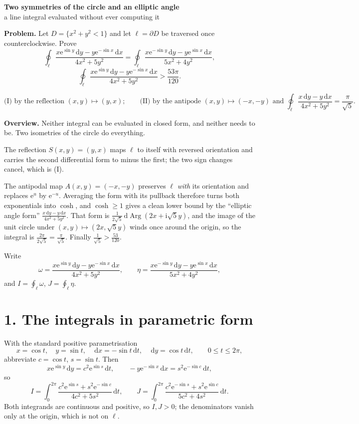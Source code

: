 \documentclass[12pt]{article}
\newcommand{\dd}{\,\mathrm{d}}
\newcommand{\ii}{\mathrm{i}}
\newcommand{\e}{\mathrm{e}}
\newcommand{\Arg}{\operatorname{Arg}}
\newcommand{\lc}{\ell}
\begin{document}
\begin{center}
{\Large\bfseries Two symmetries of the circle and an elliptic angle}\\[0.35em]
{\large a line integral evaluated without ever computing it}
\end{center}

\textbf{Problem.} Let \(D=\{x^2+y^2<1\}\) and let \(\lc=\partial D\) be
traversed once counterclockwise. Prove
\[
\oint_{\lc}\frac{x\e^{\sin y}\dd y-y\e^{-\sin x}\dd x}{4x^2+5y^2}
=\oint_{\lc}\frac{x\e^{-\sin y}\dd y-y\e^{\sin x}\dd x}{5x^2+4y^2},
\tag{I}
\]
\[
\oint_{\lc}\frac{x\e^{\sin y}\dd y-y\e^{-\sin x}\dd x}{4x^2+5y^2}
>\frac{53\pi}{120}.
\tag{II}
\]

\[
\boxed{\displaystyle
\text{(I) by the reflection }(x,y)\mapsto(y,x);
\qquad
\text{(II) by the antipode }(x,y)\mapsto(-x,-y)
\text{ and }
\oint_{\lc}\frac{x\dd y-y\dd x}{4x^2+5y^2}=\frac{\pi}{\sqrt5}.}
\]

\textbf{Overview.}
Neither integral can be evaluated in closed form, and neither needs to
be. Two isometries of the circle do everything.

The reflection \(S(x,y)=(y,x)\) maps \(\lc\) to itself with reversed
orientation and carries the second differential form to minus the first;
the two sign changes cancel, which is (I).

The antipodal map \(A(x,y)=(-x,-y)\) preserves \(\lc\) \emph{with} its
orientation and replaces \(\e^{u}\) by \(\e^{-u}\). Averaging the form
with its pullback therefore turns both exponentials into \(\cosh\), and
\(\cosh\ge1\) gives a clean lower bound by the ``elliptic angle form''
\(\frac{x\dd y-y\dd x}{4x^2+5y^2}\). That form is
\(\frac1{2\sqrt5}\dd\Arg(2x+\ii\sqrt5y)\), and the image of the unit
circle under \((x,y)\mapsto(2x,\sqrt5y)\) winds once around the origin,
so the integral is \(\frac{2\pi}{2\sqrt5}=\frac{\pi}{\sqrt5}\). Finally
\(\frac1{\sqrt5}>\frac{53}{120}\).

Write
\[
\omega=\frac{x\e^{\sin y}\dd y-y\e^{-\sin x}\dd x}{4x^2+5y^2},
\qquad
\eta=\frac{x\e^{-\sin y}\dd y-y\e^{\sin x}\dd x}{5x^2+4y^2},
\]
and \(I=\oint_\lc\omega\), \(J=\oint_\lc\eta\).

\section*{1. The integrals in parametric form}

With the standard positive parametrisation
\[
x=\cos t,\quad y=\sin t,\quad
\dd x=-\sin t\dd t,\quad \dd y=\cos t\dd t,
\qquad 0\le t\le2\pi,
\]
abbreviate \(c=\cos t\), \(s=\sin t\). Then
\[
x\e^{\sin y}\dd y=c^2\e^{\sin s}\dd t,
\qquad
-y\e^{-\sin x}\dd x=s^2\e^{-\sin c}\dd t,
\]
so
\[
I=\int_0^{2\pi}\frac{c^2\e^{\sin s}+s^2\e^{-\sin c}}{4c^2+5s^2}\dd t,
\qquad
J=\int_0^{2\pi}\frac{c^2\e^{-\sin s}+s^2\e^{\sin c}}{5c^2+4s^2}\dd t .
\tag{1}
\]
Both integrands are continuous and positive, so \(I,J>0\); the
denominators vanish only at the origin, which is not on \(\lc\).
\end{document}

